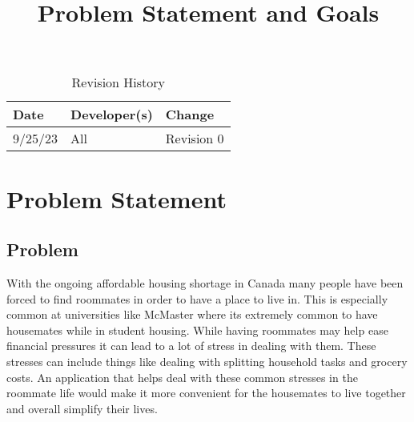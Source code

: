 \documentclass{article}
\title{Problem Statement and Goals\\\progname}
\author{\authname}
\date{}
\begin{document}
\maketitle

\begin{table}[hp]
\caption{Revision History} \label{TblRevisionHistory}
\begin{tabularx}{\textwidth}{llX}
\toprule
\textbf{Date} & \textbf{Developer(s)} & \textbf{Change}\\
\midrule
9/25/23 & All & Revision 0\\

\bottomrule
\end{tabularx}
\end{table}

\section{Problem Statement}



\subsection{Problem}

With the ongoing affordable housing shortage in Canada many people have been forced to find roommates in order to have a place to live in. This is especially common at universities like McMaster where its extremely common to have housemates while in student housing. While having roommates may help ease financial pressures it can lead to a lot of stress in dealing with them. These stresses can include things like dealing with splitting household tasks and grocery costs. An application that helps deal with these common stresses in the roommate life would make it more convenient  for the housemates to live together and overall simplify their lives.

\end{document}
